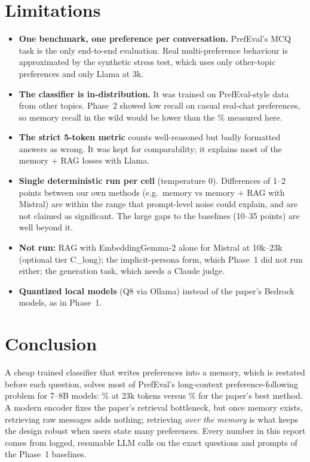 \documentclass[11pt,a4paper]{article}
\begin{document}
\section{Limitations}
\begin{itemize}
  \item \textbf{One benchmark, one preference per conversation.} PrefEval's MCQ task is the only end-to-end evaluation. Real multi-preference behaviour
        is approximated by the synthetic stress test, which uses only other-topic preferences and only Llama at 3k.
  \item \textbf{The classifier is in-distribution.} It was trained on PrefEval-style data from other topics. Phase~2 showed low recall on casual real-chat
        preferences, so memory recall in the wild would be lower than the \qMemEx\% measured here.
  \item \textbf{The strict 5-token metric} counts well-reasoned but badly formatted answers as wrong. It was kept for comparability; it explains
        most of the memory + RAG losses with Llama.
  \item \textbf{Single deterministic run per cell} (temperature 0). Differences of 1--2 points between our own methods (e.g.\ memory vs memory + RAG with
        Mistral) are within the range that prompt-level noise could explain, and are not claimed as significant. The large gaps to the baselines (10--35 points)
        are well beyond it.
  \item \textbf{Not run:} RAG with EmbeddingGemma-2 alone for Mistral at 10k--23k (optional tier C\_long); the implicit-persona form, which Phase~1
        did not run either; the generation task, which needs a Claude judge.
  \item \textbf{Quantized local models} (Q8 via Ollama) instead of the paper's Bedrock models, as in Phase~1.
\end{itemize}

\section{Conclusion}
A cheap trained classifier that writes preferences into a memory, which is restated before each question, solves most of PrefEval's long-context
preference-following problem for 7--8B models: \qMiMemTwentyThree\% at 23k tokens versus \qMiRagTwentyThree\% for the paper's best method. A modern
encoder fixes the paper's retrieval bottleneck, but once memory exists, retrieving raw messages adds nothing; retrieving \emph{over the memory}
is what keeps the design robust when users state many preferences. Every number in this report comes from \qTotalQ{} logged, resumable LLM calls
on the exact questions and prompts of the Phase~1 baselines.
\end{document}
